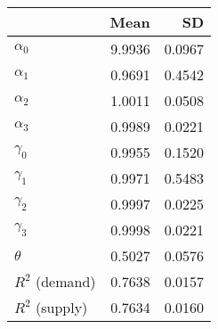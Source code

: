 
\begin{tabular}[t]{lrr}
\toprule
  & Mean & SD\\
\midrule
$\alpha_{0}$ & 9.9936 & 0.0967\\
$\alpha_{1}$ & 0.9691 & 0.4542\\
$\alpha_{2}$ & 1.0011 & 0.0508\\
$\alpha_{3}$ & 0.9989 & 0.0221\\
$\gamma_{0}$ & 0.9955 & 0.1520\\
$\gamma_{1}$ & 0.9971 & 0.5483\\
$\gamma_{2}$ & 0.9997 & 0.0225\\
$\gamma_{3}$ & 0.9998 & 0.0221\\
$\theta$ & 0.5027 & 0.0576\\
$R^{2}$ (demand) & 0.7638 & 0.0157\\
$R^{2}$ (supply) & 0.7634 & 0.0160\\
\bottomrule
\end{tabular}
